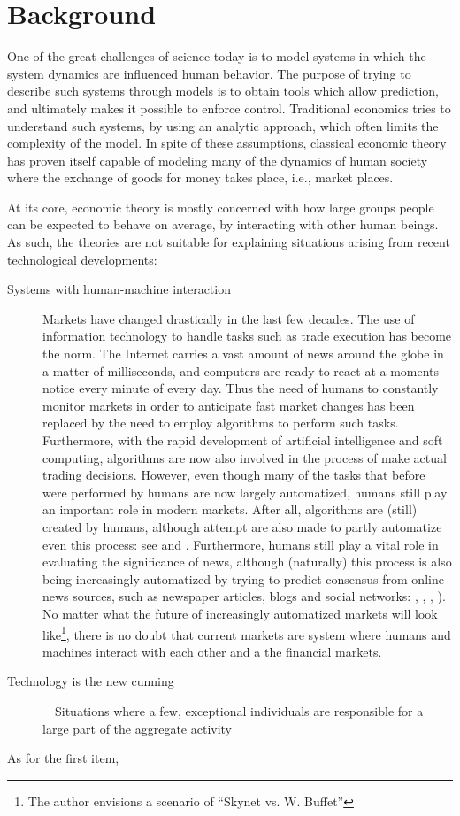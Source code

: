 \section{Background}
One of the great challenges of science today is to model systems in which the system dynamics are influenced  human behavior. The purpose of trying to describe such systems through models is to obtain tools which allow prediction, and ultimately makes it possible to enforce control. Traditional economics tries to understand such systems, by using an analytic approach, which often limits the complexity of the model. In spite of these assumptions, classical economic theory has proven itself capable of modeling many of the dynamics of human society where the exchange of goods for money takes place, i.e., market places.

At its core, economic theory is mostly concerned with how large groups people can be expected to behave on average, by interacting with other human beings. As such, the theories are not suitable for explaining situations arising from recent technological developments:
\begin{description}
\item[Systems with human-machine interaction] Markets have changed drastically in the last few decades. The use of information technology to handle tasks such as trade execution has become the norm. The Internet carries a vast amount of news around the globe in a matter of milliseconds, and computers are ready to react at a moments notice every minute of every day. Thus the need of humans to constantly monitor markets in order to anticipate fast market changes has been replaced by the need to employ algorithms to perform such tasks. Furthermore, with the rapid development of artificial intelligence and soft computing, algorithms are now also involved in the process of make actual trading decisions. However, even though many of the tasks that before were performed by humans are now largely automatized, humans still play an important role in modern markets. After all, algorithms are (still) created by humans, although attempt are also made to partly automatize even this process: see \cite{allen1999using} and \cite{potvin2004generating}. Furthermore, humans still play a vital role in evaluating the significance of news, although (naturally) this process is also being increasingly automatized by trying to predict consensus from online news sources, such as newspaper articles, blogs and social networks: \cite{devitt2007sentiment}, \cite{koppel2006good}, \cite{godbole2007large}, \cite{bollen2011twitter}). No matter what the future of increasingly automatized markets will look like\footnote{The author envisions a scenario of ``Skynet vs. W. Buffet''}, there is no doubt that current markets are system where humans and machines interact with each other and a the financial markets. 
\item[Technology is the new cunning]　Situations where a few, exceptional individuals are responsible for a large part of the aggregate activity
\end{description}
As for the first item, 

